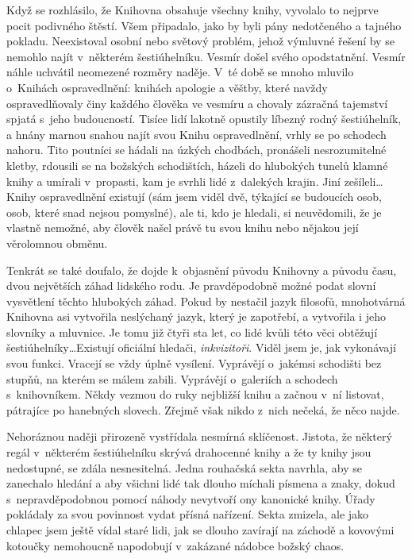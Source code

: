 \documentclass[11pt]{article}
\begin{document}
Když se rozhlásilo, že Knihovna obsahuje všechny knihy, vyvolalo to nejprve pocit podivného štěstí. Všem připadalo, jako by byli pány nedotčeného a tajného pokladu. Neexistoval osobní nebo světový problém, jehož výmluvné řešení by se nemohlo najít v~některém šestiúhelníku. Vesmír došel svého opodstatnění. Vesmír náhle uchvátil neomezené rozměry naděje. V~té době se mnoho mluvilo o~Knihách ospravedlnění: knihách apologie a věštby, které navždy ospravedlňovaly činy každého člověka ve vesmíru a chovaly zázračná tajemství spjatá s~jeho budoucností. Tisíce lidí lakotně opustily líbezný rodný šestiúhelník, a hnány marnou snahou najít svou Knihu ospravedlnění, vrhly se po schodech nahoru. Tito poutníci se hádali na úzkých chodbách, pronášeli nesrozumitelné kletby, rdousili se na božských schodištích, házeli do hlubokých tunelů klamné knihy a umírali v~propasti, kam je svrhli lidé z~dalekých krajin. Jiní zešíleli\dots Knihy ospravedlnění existují (sám jsem viděl dvě, týkající se budoucích osob, osob, které snad nejsou pomyslné), ale ti, kdo je hledali, si neuvědomili, že je vlastně nemožné, aby člověk našel právě tu svou knihu nebo nějakou její věrolomnou obměnu.

Tenkrát se také doufalo, že dojde k~objasnění původu Knihovny a původu času, dvou největších záhad lidského rodu. Je pravděpodobně možné podat slovní vysvětlení těchto hlubokých záhad. Pokud by nestačil jazyk filosofů, mnohotvárná Knihovna asi vytvořila neslýchaný jazyk, který je zapotřebí, a vytvořila i jeho slovníky a mluvnice. Je tomu již čtyři sta let, co lidé kvůli této věci obtěžují šestiúhelníky\dots Existují oficiální hledači, \textit{inkvizitoři}. Viděl jsem je, jak vykonávají svou funkci. Vracejí se vždy úplně vysílení. Vyprávějí o~jakémsi schodišti bez stupňů, na kterém se málem zabili. Vyprávějí o~galeriích a schodech s~knihovníkem. Někdy vezmou do ruky nejbližší knihu a začnou v~ní listovat, pátrajíce po hanebných slovech. Zřejmě však nikdo z~nich nečeká, že něco najde.

Nehoráznou naději přirozeně vystřídala nesmírná sklíčenost. Jistota, že některý regál v~některém šestiúhelníku skrývá drahocenné knihy a že ty knihy jsou nedostupné, se zdála nesnesitelná. Jedna rouhačská sekta navrhla, aby se zanechalo hledání a aby všichni lidé tak dlouho míchali písmena a znaky, dokud s~nepravděpodobnou pomocí náhody nevytvoří ony kanonické knihy. Úřady pokládaly za svou povinnost vydat přísná nařízení. Sekta zmizela, ale jako chlapec jsem ještě vídal staré lidi, jak se dlouho zavírají na záchodě a kovovými kotoučky nemohoucně napodobují v~zakázané nádobce božský chaos.
\end{document}

